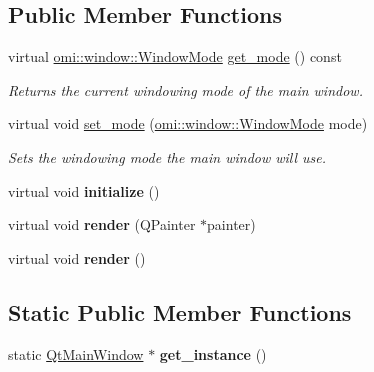 \subsection*{Public Member Functions}
\begin{DoxyCompactItemize}
\item 
virtual \hyperlink{namespaceomi_1_1window_a096dc3d82796b93c067bca535fc0f94e}{omi\+::window\+::\+Window\+Mode} \hyperlink{classomi__qt_1_1_qt_main_window_ad85e96d8fa71189b3fc0472d0ddadc94}{get\+\_\+mode} () const \hypertarget{classomi__qt_1_1_qt_main_window_ad85e96d8fa71189b3fc0472d0ddadc94}{}\label{classomi__qt_1_1_qt_main_window_ad85e96d8fa71189b3fc0472d0ddadc94}

\begin{DoxyCompactList}\small\item\em Returns the current windowing mode of the main window. \end{DoxyCompactList}\item 
virtual void \hyperlink{classomi__qt_1_1_qt_main_window_ae2135c6116f4e9f59bf5a8b9ff489900}{set\+\_\+mode} (\hyperlink{namespaceomi_1_1window_a096dc3d82796b93c067bca535fc0f94e}{omi\+::window\+::\+Window\+Mode} mode)\hypertarget{classomi__qt_1_1_qt_main_window_ae2135c6116f4e9f59bf5a8b9ff489900}{}\label{classomi__qt_1_1_qt_main_window_ae2135c6116f4e9f59bf5a8b9ff489900}

\begin{DoxyCompactList}\small\item\em Sets the windowing mode the main window will use. \end{DoxyCompactList}\item 
virtual void {\bfseries initialize} ()\hypertarget{classomi__qt_1_1_qt_main_window_ac0234c8d46ff7eeaff496af396aa0b07}{}\label{classomi__qt_1_1_qt_main_window_ac0234c8d46ff7eeaff496af396aa0b07}

\item 
virtual void {\bfseries render} (Q\+Painter $\ast$painter)\hypertarget{classomi__qt_1_1_qt_main_window_a8fe6ae835391157ada1dfad9f0dc6471}{}\label{classomi__qt_1_1_qt_main_window_a8fe6ae835391157ada1dfad9f0dc6471}

\item 
virtual void {\bfseries render} ()\hypertarget{classomi__qt_1_1_qt_main_window_a6eb5a5e82624efe3c2f4f4d276ecba5b}{}\label{classomi__qt_1_1_qt_main_window_a6eb5a5e82624efe3c2f4f4d276ecba5b}

\end{DoxyCompactItemize}
\subsection*{Static Public Member Functions}
\begin{DoxyCompactItemize}
\item 
static \hyperlink{classomi__qt_1_1_qt_main_window}{Qt\+Main\+Window} $\ast$ {\bfseries get\+\_\+instance} ()\hypertarget{classomi__qt_1_1_qt_main_window_a4eb9d409a548e72709caed347c75fd59}{}\label{classomi__qt_1_1_qt_main_window_a4eb9d409a548e72709caed347c75fd59}

\end{DoxyCompactItemize}
